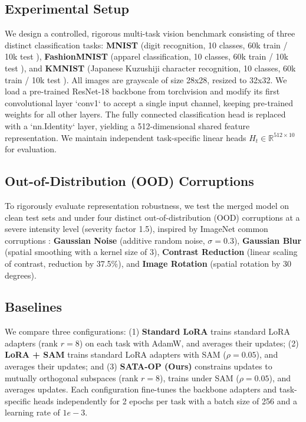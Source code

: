 \documentclass{article}
\theoremstyle{plain}
\theoremstyle{definition}
\theoremstyle{remark}
\begin{document}
\subsection{Experimental Setup}
We design a controlled, rigorous multi-task vision benchmark consisting of three distinct classification tasks: \textbf{MNIST} (digit recognition, 10 classes, 60k train / 10k test \cite{lecun1998gradient}), \textbf{FashionMNIST} (apparel classification, 10 classes, 60k train / 10k test \cite{xiao2017fashion}), and \textbf{KMNIST} (Japanese Kuzushiji character recognition, 10 classes, 60k train / 10k test \cite{clanuwat2018deep}). All images are grayscale of size 28x28, resized to 32x32. We load a pre-trained ResNet-18 backbone from torchvision and modify its first convolutional layer `conv1` to accept a single input channel, keeping pre-trained weights for all other layers. The fully connected classification head is replaced with a `nn.Identity` layer, yielding a 512-dimensional shared feature representation. We maintain independent task-specific linear heads $H_t \in \mathbb{R}^{512 \times 10}$ for evaluation.

\subsection{Out-of-Distribution (OOD) Corruptions}
To rigorously evaluate representation robustness, we test the merged model on clean test sets and under four distinct out-of-distribution (OOD) corruptions at a severe intensity level (severity factor 1.5), inspired by ImageNet common corruptions \cite{hendrycks2019benchmarking}: \textbf{Gaussian Noise} (additive random noise, $\sigma=0.3$), \textbf{Gaussian Blur} (spatial smoothing with a kernel size of 3), \textbf{Contrast Reduction} (linear scaling of contrast, reduction by 37.5\%), and \textbf{Image Rotation} (spatial rotation by 30 degrees).

\subsection{Baselines}
We compare three configurations: (1) \textbf{Standard LoRA} trains standard LoRA adapters (rank $r=8$) on each task with AdamW, and averages their updates; (2) \textbf{LoRA + SAM} trains standard LoRA adapters with SAM ($\rho=0.05$), and averages their updates; and (3) \textbf{SATA-OP (Ours)} constrains updates to mutually orthogonal subspaces (rank $r=8$), trains under SAM ($\rho=0.05$), and averages updates. Each configuration fine-tunes the backbone adapters and task-specific heads independently for 2 epochs per task with a batch size of 256 and a learning rate of $1e-3$.
\end{document}
